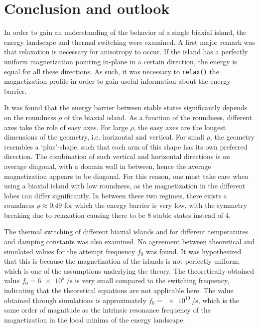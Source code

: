 \documentclass[11pt,a4paper,english,twoside]{article}
\newcommand{\code}[1]{\texttt{#1}}
\begin{document}
\section{Conclusion and outlook}
In order to gain an understanding of the behavior of a single biaxial island, the energy landscape and thermal switching were examined. A first major remark was that relaxation is necessary for anisotropy to occur. If the island has a perfectly uniform magnetization pointing in-plane in a certain direction, the energy is equal for all these directions. As such, it was necessary to \code{relax()} the magnetization profile in order to gain useful information about the energy barrier. \par
It was found that the energy barrier between stable states significantly depends on the roundness $\rho$ of the biaxial island. As a function of the roundness, different axes take the role of easy axes. For large $\rho$, the easy axes are the longest dimensions of the geometry, i.e. horizontal and vertical. For small $\rho$, the geometry resembles a `plus'-shape, such that each arm of this shape has its own preferred direction. The combination of such vertical and horizontal directions is on average diagonal, with a domain wall in between, hence the average magnetization appears to be diagonal. For this reason, one must take care when using a biaxial island with low roundness, as the magnetization in the different lobes can differ significantly. In between these two regimes, there exists a roundness $\rho \approx 0.49$ for which the energy barrier is very low, with the symmetry breaking due to relaxation causing there to be 8 stable states instead of 4. \par
The thermal switching of different biaxial islands and for different temperatures and damping constants was also examined. No agreement between theoretical and simulated values for the attempt frequency $f_0$ was found. It was hypothesized that this is because the magnetization of the islands is not perfectly uniform, which is one of the assumptions underlying the theory. The theoretically obtained value $f_0=\SI{6e5}{\per\second}$ is very small compared to the switching frequency, indicating that the theoretical equations are not applicable here. The value obtained through simulations is approximately $f_0=\SI{e10}{\per\second}$, which is the same order of magnitude as the intrinsic resonance frequency of the magnetization in the local minima of the energy landscape. \par
\end{document}
